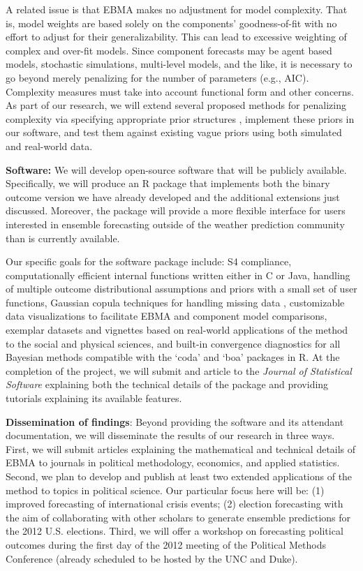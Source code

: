 \documentclass[pdftex,12pt,fullpage,oneside]{amsart}
\begin{document}
A related issue is that EBMA makes no adjustment for model complexity.
That is, model weights are based solely on the components'
goodness-of-fit with no effort to adjust for their generalizability.
This can lead to excessive weighting of complex and over-fit models.
Since component forecasts may be agent based models, stochastic
simulations, multi-level models, and the like, it is necessary to go
beyond merely penalizing for the number of parameters (e.g., AIC).  Complexity measures must take into account functional form and
other concerns.  As part of our research, we will extend several
proposed methods for penalizing complexity via specifying appropriate
prior structures \citep[c.f.,][]{Pitt:2002a, Pitt:2002b}, implement
these priors in our software, and test them against existing vague
priors using both simulated and real-world data.

\textbf{Software:} We will develop open-source software that will be
publicly available.  Specifically, we will produce an R package that
implements both the binary outcome version we have already developed
and the additional extensions just discussed.  Moreover, the package
will provide a more flexible interface for users interested in
ensemble forecasting outside of the weather prediction community than
is currently available.  

Our specific goals for the software package include: S4 compliance,
computationally efficient internal functions written either in C or
Java, handling of multiple outcome distributional assumptions and
priors with a small set of user functions, Gaussian copula techniques
for handling missing data \citep{Hoff:2007}, customizable data
visualizations to facilitate EBMA and component model comparisons,
exemplar datasets and vignettes based on real-world
applications of the method to the social and physical sciences, and
built-in convergence diagnostics for all Bayesian methods compatible
with the `coda' and `boa' packages in R.  At the completion of the
project, we will submit and article to the \textit{Journal of
  Statistical Software} explaining both the technical details of the
package and providing tutorials explaining its available features.

\textbf{Dissemination of findings}: Beyond providing the software and
its attendant documentation, we will disseminate the results of our
research in three ways.  First, we will submit articles explaining the
mathematical and technical details of EBMA to journals in political
methodology, economics, and applied statistics.  Second, we plan to
develop and publish at least two extended applications of the method
to topics in political science.  Our particular focus here will be:
(1) improved forecasting of international crisis events; (2) election
forecasting with the aim of collaborating with other scholars to
generate ensemble predictions for the 2012 U.S. elections.  Third, we
will offer a workshop on forecasting political outcomes during the
first day of the 2012 meeting of the Political Methods Conference
(already scheduled to be hosted by the UNC and Duke).
\end{document}

